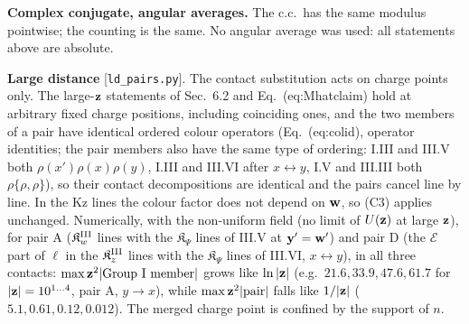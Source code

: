 \noindent\textbf{Complex conjugate, angular averages.} The c.c.\ has the same modulus pointwise; the counting is the same. No angular average was used: all statements above are absolute.

\noindent\textbf{Large distance} [\texttt{ld\_pairs.py}]. The contact substitution acts on charge points only. The large-$\mathbf{z}$ statements of Sec.~6.2 and Eq.~(eq:Mhatclaim) hold at arbitrary fixed charge positions, including coinciding ones, and the two members of a pair have identical ordered colour operators (Eq.~(eq:colid), operator identities; the pair members also have the same type of ordering: I.III and III.V both $\rho(x')\rho(x)\rho(y)$, I.III and III.VI after $x\leftrightarrow y$, I.V and III.III both $\rho\{\rho,\rho\}$), so their contact decompositions are identical and the pairs cancel line by line. In the Kz lines the colour factor does not depend on $\mathbf{w}$, so (C3) applies unchanged. Numerically, with the non-uniform field (no limit of $U(\mathbf{z})$ at large $\mathbf{z}$), for pair A ($\mathfrak K^{\rm III}_w$ lines with the $\mathfrak K_\Psi$ lines of III.V at $\mathbf{y}'=\mathbf{w}'$) and pair D (the $\mathcal E$ part of $\ell$ in the $\mathfrak K^{\rm III}_z$ lines with the $\mathfrak K_\Psi$ lines of III.VI, $x\leftrightarrow y$), in all three contacts: $\max\mathbf{z}^2|\text{Group I member}|$ grows like $\ln|\mathbf{z}|$ (e.g.\ $21.6,33.9,47.6,61.7$ for $|\mathbf{z}|=10^{1\dots4}$, pair A, $y\to x$), while $\max\mathbf{z}^2|\text{pair}|$ falls like $1/|\mathbf{z}|$ ($5.1,0.61,0.12,0.012$). The merged charge point is confined by the support of $n$.

